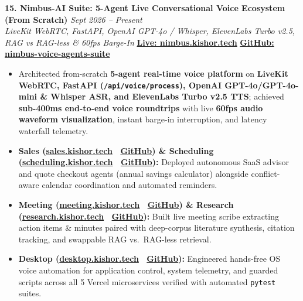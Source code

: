 \documentclass[9.5pt,a4paper]{article}
\begin{document}
\vspace{2.0pt}
\noindent\textbf{15. Nimbus-AI Suite: 5-Agent Live Conversational Voice Ecosystem (From Scratch)} \hfill {\small\textit{Sept 2026 -- Present}}\\
\textit{LiveKit WebRTC, FastAPI, OpenAI GPT-4o / Whisper, ElevenLabs Turbo v2.5, RAG vs RAG-less \& 60fps Barge-In} \hfill {\footnotesize\href{https://nimbus.kishor.tech/}{\textbf{Live: nimbus.kishor.tech}} \;\textbar\; \href{https://github.com/KishorKumarParoi/nimbus-voice-agents-suite}{\textbf{GitHub: nimbus-voice-agents-suite}}}
\begin{itemize}
    \item Architected from-scratch \textbf{5-agent real-time voice platform} on \textbf{LiveKit WebRTC, FastAPI (\texttt{/api/voice/process}), OpenAI GPT-4o/GPT-4o-mini \& Whisper ASR, and ElevenLabs Turbo v2.5 TTS}; achieved \textbf{sub-400ms end-to-end voice roundtrips} with live \textbf{60fps audio waveform visualization}, instant barge-in interruption, and latency waterfall telemetry.
    \item \textbf{Sales (\href{https://sales.kishor.tech/}{sales.kishor.tech} \textbar\ \href{https://github.com/KishorKumarParoi/sales-voice-agent}{GitHub}) \& Scheduling (\href{https://scheduling.kishor.tech/}{scheduling.kishor.tech} \textbar\ \href{https://github.com/KishorKumarParoi/scheduling-voice-agent}{GitHub}):} Deployed autonomous SaaS advisor and quote checkout agents (annual savings calculator) alongside conflict-aware calendar coordination and automated reminders.
    \item \textbf{Meeting (\href{https://meeting.kishor.tech/}{meeting.kishor.tech} \textbar\ \href{https://github.com/KishorKumarParoi/meeting-voice-agent}{GitHub}) \& Research (\href{https://research.kishor.tech/}{research.kishor.tech} \textbar\ \href{https://github.com/KishorKumarParoi/research-voice-agent}{GitHub}):} Built live meeting scribe extracting action items \& minutes paired with deep-corpus literature synthesis, citation tracking, and swappable RAG vs.\ RAG-less retrieval.
    \item \textbf{Desktop (\href{https://desktop.kishor.tech/}{desktop.kishor.tech} \textbar\ \href{https://github.com/KishorKumarParoi/desktop-voice-agent}{GitHub}):} Engineered hands-free OS voice automation for application control, system telemetry, and guarded scripts across all 5 Vercel microservices verified with automated \texttt{pytest} suites.
\end{itemize}
\end{document}
